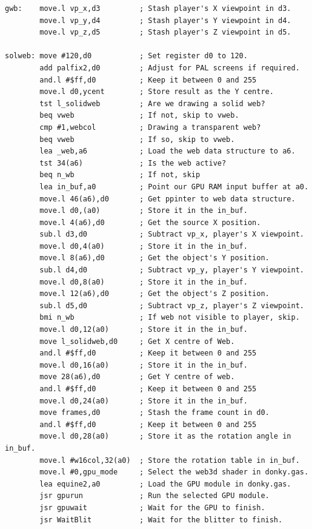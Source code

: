 \begin{lstlisting}[escapechar=\%]
gwb:    move.l vp_x,d3         ; Stash player's X viewpoint in d3.
        move.l vp_y,d4         ; Stash player's Y viewpoint in d4.
        move.l vp_z,d5         ; Stash player's Z viewpoint in d5.
    
solweb: move #120,d0           ; Set register d0 to 120.
        add palfix2,d0         ; Adjust for PAL screens if required.
        and.l #$ff,d0          ; Keep it between 0 and 255
        move.l d0,ycent        ; Store result as the Y centre.
        tst l_solidweb         ; Are we drawing a solid web?
        beq vweb               ; If not, skip to vweb. 
        cmp #1,webcol          ; Drawing a transparent web?
        beq vweb               ; If so, skip to vweb.
        lea _web,a6            ; Load the web data structure to a6.
        tst 34(a6)             ; Is the web active? 
        beq n_wb               ; If not, skip 
        lea in_buf,a0          ; Point our GPU RAM input buffer at a0.
        move.l 46(a6),d0       ; Get ppinter to web data structure.
        move.l d0,(a0)         ; Store it in the in_buf.
        move.l 4(a6),d0        ; Get the source X position.
        sub.l d3,d0            ; Subtract vp_x, player's X viewpoint.
        move.l d0,4(a0)        ; Store it in the in_buf.
        move.l 8(a6),d0        ; Get the object's Y position.
        sub.l d4,d0            ; Subtract vp_y, player's Y viewpoint.
        move.l d0,8(a0)        ; Store it in the in_buf.
        move.l 12(a6),d0       ; Get the object's Z position.
        sub.l d5,d0            ; Subtract vp_z, player's Z viewpoint.
        bmi n_wb               ; If web not visible to player, skip.
        move.l d0,12(a0)       ; Store it in the in_buf.
        move l_solidweb,d0     ; Get X centre of Web. 
        and.l #$ff,d0          ; Keep it between 0 and 255
        move.l d0,16(a0)       ; Store it in the in_buf.
        move 28(a6),d0         ; Get Y centre of web.
        and.l #$ff,d0          ; Keep it between 0 and 255
        move.l d0,24(a0)       ; Store it in the in_buf.
        move frames,d0         ; Stash the frame count in d0.
        and.l #$ff,d0          ; Keep it between 0 and 255
        move.l d0,28(a0)       ; Store it as the rotation angle in in_buf.
        move.l #w16col,32(a0)  ; Store the rotation table in in_buf.
        move.l #0,gpu_mode     ; Select the web3d shader in donky.gas.
        lea equine2,a0         ; Load the GPU module in donky.gas.
        jsr gpurun             ; Run the selected GPU module.
        jsr gpuwait            ; Wait for the GPU to finish.
        jsr WaitBlit           ; Wait for the blitter to finish.
    
\end{lstlisting}
